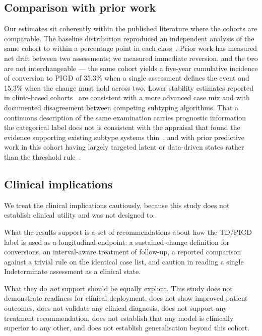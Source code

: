 \documentclass[11pt]{article}
\begin{document}
\subsection{Comparison with prior work}
Our estimates sit coherently within the published literature where the cohorts
are comparable. The baseline distribution reproduced an independent analysis of
the same cohort to within a percentage point in each class~\citep{simuni2016}.
Prior work has measured net drift between two assessments; we measured immediate
reversion, and the two are not interchangeable --- the same cohort yields a
five-year cumulative incidence of conversion to PIGD of 35.3\% when a single
assessment defines the event and 15.3\% when the change must hold across two.
Lower stability estimates reported in clinic-based
cohorts~\citep{ren2020,ren2021,kohat2021,voncoelln2021} are consistent with a
more advanced case mix and with documented disagreement between competing
subtyping algorithms. That a continuous description of the same examination
carries prognostic information the categorical label does not is consistent with
the appraisal that found the evidence supporting existing subtype systems
thin~\citep{mestre2021,marras2024}, and with prior predictive work in this cohort
having largely targeted latent or data-driven states rather than the threshold
rule~\citep{severson2021,fereshtehnejad2017,dadu2022}.

\subsection{Clinical implications}
We treat the clinical implications cautiously, because this study does not
establish clinical utility and was not designed to.

What the results support is a set of recommendations about how the TD/PIGD label
is used as a longitudinal endpoint: a sustained-change definition for
conversions, an interval-aware treatment of follow-up, a reported comparison
against a trivial rule on the identical case list, and caution in reading a
single Indeterminate assessment as a clinical state.

What they do \emph{not} support should be equally explicit. This study does not
demonstrate readiness for clinical deployment, does not show improved patient
outcomes, does not validate any clinical diagnosis, does not support any treatment
recommendation, does not establish that any model is clinically superior to any
other, and does not establish generalisation beyond this cohort.
\end{document}
